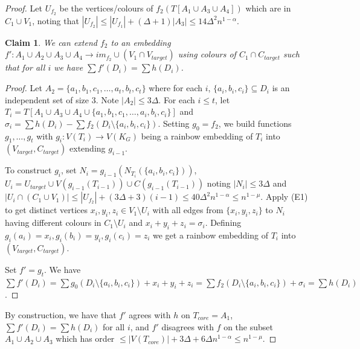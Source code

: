 \documentclass[a4paper,11pt,hidelinks]{amsart}
\newtheorem{claim}[theorem]{Claim}
\theoremstyle{definition}
\begin{document}
\begin{proof}
Let $U_{f_2}$ be the vertices/colours of  $f_2(T[A_1\cup A_3\cup A_4])$ which are in  $C_1\cup V_1$, noting that $|U_{f_2}|\leq |U_{f_1}|+  (\Delta+1)|A_3|\leq 14\Delta^2 n^{1-\alpha}$.
 

 \begin{claim}\label{Claim_modify_random_embedding2}
 We can  extend $f_2$ to an embedding $f': A_1\cup A_2\cup A_3\cup A_4\to im_{f_2}\cup (V_1\cap V_{target})$ using colours of $C_1\cap C_{target}$ such that for all $i$  we have $\sum f'(D_i)=\sum h(D_i)$.
 \end{claim}
 \begin{proof}
Let $A_2=\{a_1,b_1, c_1,  \dots, a_t, b_t, c_t\}$ where for each $i$, $\{a_i, b_i, c_i\}\subseteq D_i$ is an independent set of size 3. Note $|A_2|\leq 3\Delta$. For each $i\leq t$, let $T_i=T[A_1\cup A_3\cup A_4\cup\{a_1,b_1, c_1, \dots, a_i, b_i, c_i\}]$ and  $\sigma_i=\sum h(D_i)-\sum f_2(D_i\setminus \{a_i, b_i, c_i\})$.
Setting $g_0=f_2$, we build functions $g_1, \dots, g_t$ with $g_i:V(T_i)\to V(K_G)$ being a rainbow embedding of $T_i$ into $(V_{target}, C_{target})$ extending $g_{i-1}$.

To construct $g_i$, set $N_i=g_{i-1}(N_{T_i}(\{a_i, b_i, c_i\}))$, $U_i=U_{target}\cup V(g_{i-1}(T_{i-1}))\cup C(g_{i-1}(T_{i-1}))$ noting $|N_i|\leq 3\Delta$ and $|U_i\cap (C_1\cup V_1)|\leq |U_{f_2}| + (3\Delta+3)(i-1)\leq 40\Delta^2 n^{1-\alpha}\leq n^{1-\mu}$.  Apply (E1) to get distinct vertices $x_i, y_i, z_i\in V_1\setminus U_i$ with all edges from $\{x_i, y_i, z_i\}$ to $N_i$ having different colours in $C_1\setminus U_i$ and $x_i+y_i+z_i=\sigma_i$. Defining $g_i(a_i)=x_i, g_i(b_i)=y_i, g_i(c_i)=z_i$ we get a rainbow embedding of $T_i$ into $(V_{target}, C_{target})$. 

Set $f'=g_t$. We have  $\sum f'(D_i)=\sum g_0(D_{i}\setminus\{a_i, b_i, c_i\})+x_i+y_i+z_i=\sum f_2(D_{i}\setminus\{a_i, b_i, c_i\})+\sigma_i=\sum h(D_i)$.
\end{proof}
By construction, we have that $f'$ agrees with $h$ on $T_{core}=A_1$, $\sum f'(D_i)= \sum h(D_i)$ for all $i$, and $f'$ disagrees with $f$ on the subset $A_1\cup A_2\cup A_3$ which has order $\leq |V({T_{core}})|+ 3\Delta+ 6\Delta n^{1-\alpha}\le n^{1-\mu}$.
\end{proof}
\end{document}
